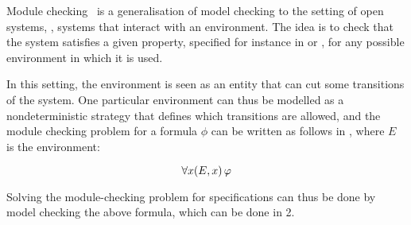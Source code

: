 Module checking~\cite{kupferman2001module} is a generalisation of model checking to the setting
of open systems, \ie, systems that interact with an environment. The
idea is to check that the system satisfies a given property, specified
for instance in \LTL or \CTLs, for any possible environment in which
it is used.

In this setting, the environment is seen as an entity that can cut
some transitions of the system. One particular environment can thus be
modelled as a nondeterministic strategy that defines which transitions
are allowed, and the module checking problem for a \CTLs formula $\phi$ can
be written as follows in \SLref, where $E$ is the environment:

\[\forall x (E,x) \,\varphi\]

Solving the module-checking problem for \CTLs specifications can thus
be done by model checking the above \SLref formula, which can be done
in 2\EXPTIME.

